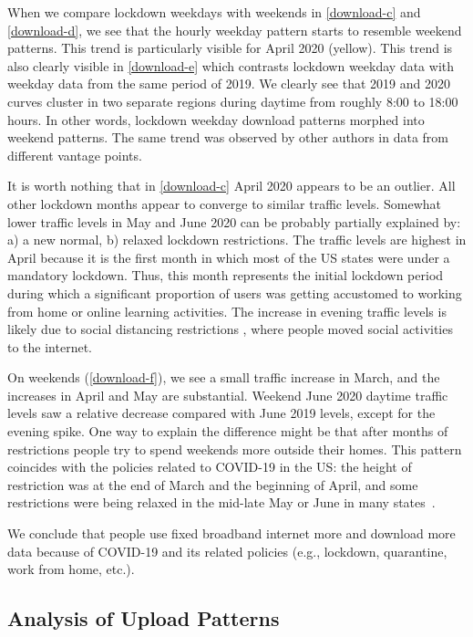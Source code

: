 When we compare lockdown weekdays with weekends in \cref{download-c} and \cref{download-d}, we see that the hourly weekday pattern starts to resemble weekend patterns. This trend is particularly visible for April 2020 (yellow). This trend is also clearly visible in \cref{download-e} which contrasts lockdown weekday data with weekday data from the same period of 2019. We clearly see that 2019 and 2020 curves cluster in two separate regions during daytime from roughly 8:00 to 18:00 hours. In other words, lockdown weekday download patterns morphed into weekend patterns. The same trend was observed by other authors in data from different vantage points.%

It is worth nothing that in \cref{download-c} April 2020 appears to be an outlier. All other lockdown months appear to converge to similar traffic levels. Somewhat lower traffic levels in May and June 2020 can be probably partially explained by: a) a new normal, b) relaxed lockdown restrictions. The traffic levels are highest in April because it is the first month in which most of the \gls{US} states were under a mandatory lockdown. Thus, this month represents the initial lockdown period during which a significant proportion of users was getting accustomed to working from home or online learning activities. The increase in evening traffic levels is likely due to social distancing restrictions \cite{lockdownsguide}, where people moved social activities to the internet.

On weekends (\cref{download-f}), we see a small traffic increase in March, and the increases in April and May are substantial. Weekend June 2020 daytime traffic levels saw a relative decrease compared with June 2019 levels, except for the evening spike. One way to explain the difference might be that after months of restrictions people try to spend weekends more outside their homes. This pattern coincides with the policies related to COVID-19 in the \gls{US}: the height of restriction was at the end of March and the beginning of April, and some restrictions were being relaxed in the mid-late May or June in many states~\cite{covid19restriction}.

We conclude that people use fixed broadband internet more and download more data because of COVID-19 and its related policies (e.g., lockdown, quarantine, work from home, etc.).

\subsection{Analysis of Upload Patterns}\label{sec:analysis-of-upload-patterns}

